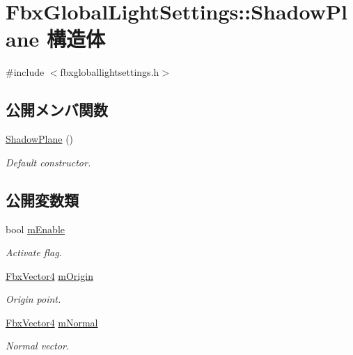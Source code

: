 \hypertarget{struct_fbx_global_light_settings_1_1_shadow_plane}{}\section{Fbx\+Global\+Light\+Settings\+:\+:Shadow\+Plane 構造体}
\label{struct_fbx_global_light_settings_1_1_shadow_plane}


{\ttfamily \#include $<$fbxgloballightsettings.\+h$>$}

\subsection*{公開メンバ関数}
\begin{DoxyCompactItemize}
\item 
\hyperlink{struct_fbx_global_light_settings_1_1_shadow_plane_a1bca8105fa3d43f4ac22480cc68833cc}{Shadow\+Plane} ()
\begin{DoxyCompactList}\small\item\em Default constructor. \end{DoxyCompactList}\end{DoxyCompactItemize}
\subsection*{公開変数類}
\begin{DoxyCompactItemize}
\item 
bool \hyperlink{struct_fbx_global_light_settings_1_1_shadow_plane_a1587089f4329de3c417738e5cf12513d}{m\+Enable}
\begin{DoxyCompactList}\small\item\em Activate flag. \end{DoxyCompactList}\item 
\hyperlink{class_fbx_vector4}{Fbx\+Vector4} \hyperlink{struct_fbx_global_light_settings_1_1_shadow_plane_aab22ea42cde196c6aebce68258f76fd4}{m\+Origin}
\begin{DoxyCompactList}\small\item\em Origin point. \end{DoxyCompactList}\item 
\hyperlink{class_fbx_vector4}{Fbx\+Vector4} \hyperlink{struct_fbx_global_light_settings_1_1_shadow_plane_af68d57885d38ed6679a04bea2e663a33}{m\+Normal}
\begin{DoxyCompactList}\small\item\em Normal vector. \end{DoxyCompactList}\end{DoxyCompactItemize}


